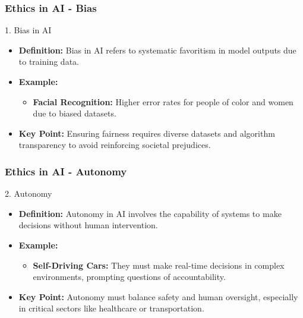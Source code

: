\documentclass[aspectratio=169]{beamer}
\begin{document}
\begin{frame}[fragile]
    \frametitle{Ethics in AI - Bias}
    \begin{block}{1. Bias in AI}
        \begin{itemize}
            \item \textbf{Definition:} Bias in AI refers to systematic favoritism in model outputs due to training data.
            \item \textbf{Example:} 
            \begin{itemize}
                \item \textbf{Facial Recognition:} Higher error rates for people of color and women due to biased datasets.
            \end{itemize}
            \item \textbf{Key Point:} Ensuring fairness requires diverse datasets and algorithm transparency to avoid reinforcing societal prejudices.
        \end{itemize}
    \end{block}
\end{frame}

\begin{frame}[fragile]
    \frametitle{Ethics in AI - Autonomy}
    \begin{block}{2. Autonomy}
        \begin{itemize}
            \item \textbf{Definition:} Autonomy in AI involves the capability of systems to make decisions without human intervention.
            \item \textbf{Example:} 
            \begin{itemize}
                \item \textbf{Self-Driving Cars:} They must make real-time decisions in complex environments, prompting questions of accountability.
            \end{itemize}
            \item \textbf{Key Point:} Autonomy must balance safety and human oversight, especially in critical sectors like healthcare or transportation.
        \end{itemize}
    \end{block}
\end{frame}
\end{document}
